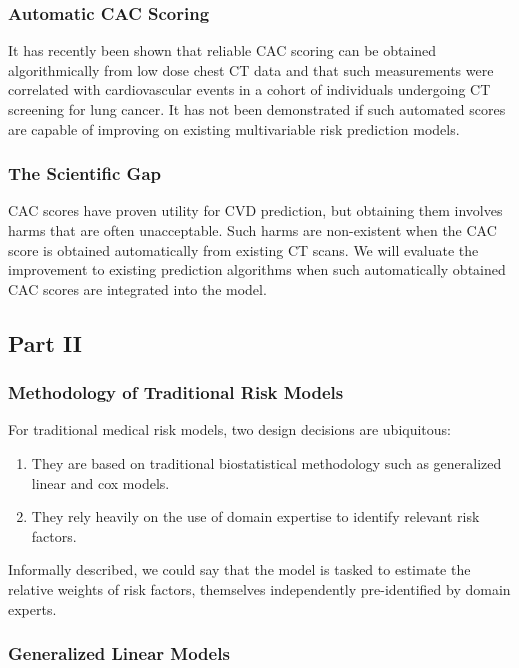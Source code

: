 \documentclass[a4paper,12pt]{article}
\begin{document}
			\subsubsection{Automatic CAC Scoring}
			It has recently been shown that reliable CAC scoring can be obtained algorithmically from low dose chest CT data\cite{Isgum2012,Shadmi2018} and that such measurements were correlated with cardiovascular events in a cohort of individuals undergoing CT screening for lung cancer\cite{Takx2015a}. It has not been demonstrated if such automated scores are capable of improving on existing multivariable risk prediction models\cite{Force2018}.
			
			\subsubsection{The Scientific Gap}
			CAC scores have proven utility for CVD prediction, but obtaining them involves harms that are often unacceptable. Such harms are non-existent when the CAC score is obtained automatically from existing CT scans. We will evaluate the improvement to existing prediction algorithms when such automatically obtained CAC scores are integrated into the model.
			
		\subsection{Part II}
		
			\subsubsection{Methodology of Traditional Risk Models}
		
			For traditional medical risk models, two design decisions are ubiquitous\cite{Weng2017}:
			\begin{enumerate}
				\item They are based on traditional biostatistical methodology such as generalized linear and cox models.
				\item They rely heavily on the use of domain expertise to identify relevant risk factors.
			\end{enumerate}
		
			Informally described, we could say that the model is tasked to estimate the relative weights of risk factors, themselves independently pre-identified by domain experts.
		
			\subsubsection{Generalized Linear Models}
			
\end{document}
